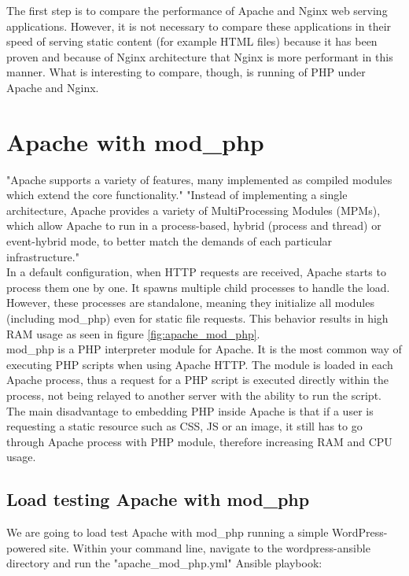 The first step is to compare the performance of Apache and Nginx web serving applications. However, it is not necessary to compare these applications in their speed of serving static content (for example HTML files) because it has been proven and because of Nginx architecture that Nginx is more performant in this manner. What is interesting to compare, though, is running of PHP under Apache and Nginx.

\section{Apache with mod\_php} \label{nginx-apache}

"Apache supports a variety of features, many implemented as compiled modules which extend the core functionality." "Instead of implementing a single architecture, Apache provides a variety of MultiProcessing Modules (MPMs), which allow Apache to run in a process-based, hybrid (process and thread) or event-hybrid mode, to better match the demands of each particular infrastructure." \cite{Apache:Wiki}\\

In a default configuration, when HTTP requests are received, Apache starts to process them one by one. It spawns multiple child processes to handle the load. However, these processes are standalone, meaning they initialize all modules (including mod\_php) even for static file requests. This behavior results in high RAM usage as seen in figure \ref{fig:apache_mod_php}. \\

mod\_php is a PHP interpreter module for Apache. It is the most common way of executing PHP scripts when using Apache HTTP. The module is loaded in each Apache process, thus a request for a PHP script is executed directly within the process, not being relayed to another server with the ability to run the script. The main disadvantage to embedding PHP inside Apache is that if a user is requesting a static resource such as CSS, JS or an image, it still has to go through Apache process with PHP module, therefore increasing RAM and CPU usage.

\subsection{Load testing Apache with mod\_php}

We are going to load test Apache with mod\_php running a simple WordPress-powered site. Within your command line, navigate to the wordpress-ansible directory and run the "apache\_mod\_php.yml" Ansible playbook:

